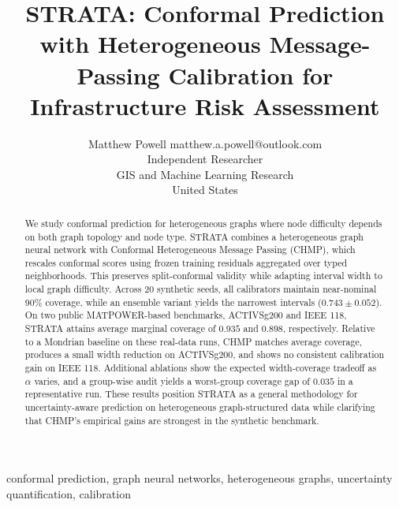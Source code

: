 \documentclass[twoside,11pt]{article}
\begin{document}
\title{STRATA: Conformal Prediction with Heterogeneous Message-Passing Calibration for Infrastructure Risk Assessment}

\author{\name Matthew Powell \email matthew.a.powell@outlook.com \\
        \addr Independent Researcher\\
        GIS and Machine Learning Research\\
        United States}


\maketitle

\begin{abstract}%
We study conformal prediction for heterogeneous graphs where node difficulty depends on both graph topology and node type. STRATA combines a heterogeneous graph neural network with Conformal Heterogeneous Message Passing (CHMP), which rescales conformal scores using frozen training residuals aggregated over typed neighborhoods. This preserves split-conformal validity while adapting interval width to local graph difficulty. Across 20 synthetic seeds, all calibrators maintain near-nominal 90\% coverage, while an ensemble variant yields the narrowest intervals ($0.743 \pm 0.052$). On two public MATPOWER-based benchmarks, ACTIVSg200 and IEEE 118, STRATA attains average marginal coverage of $0.935$ and $0.898$, respectively. Relative to a Mondrian baseline on these real-data runs, CHMP matches average coverage, produces a small width reduction on ACTIVSg200, and shows no consistent calibration gain on IEEE 118. Additional ablations show the expected width-coverage tradeoff as $\alpha$ varies, and a group-wise audit yields a worst-group coverage gap of $0.035$ in a representative run. These results position STRATA as a general methodology for uncertainty-aware prediction on heterogeneous graph-structured data while clarifying that CHMP's empirical gains are strongest in the synthetic benchmark.
\end{abstract}

\begin{keywords}
conformal prediction, graph neural networks, heterogeneous graphs, uncertainty quantification, calibration
\end{keywords}

\end{document}
